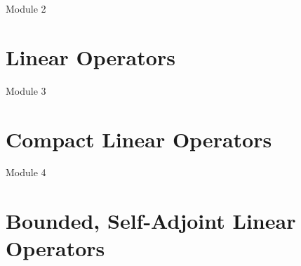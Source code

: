 {\Large Module 2}
\section{Linear Operators}
{\Large Module 3}
\section{Compact Linear Operators}
{\Large Module 4}
\section{Bounded, Self-Adjoint Linear Operators}
